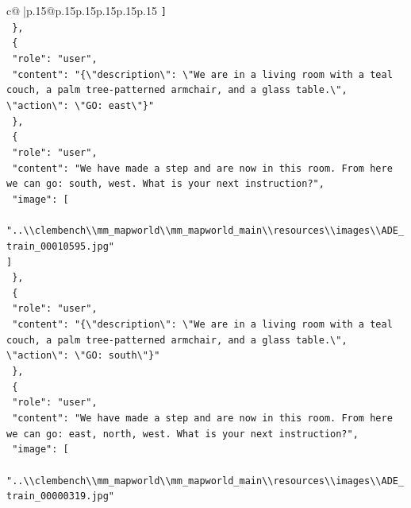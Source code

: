 \documentclass{article}
\begin{document}
{\begin{supertabular}{c@{$\;$}|p{.15\linewidth}@{}p{.15\linewidth}p{.15\linewidth}p{.15\linewidth}p{.15\linewidth}p{.15\linewidth}}
{{{\texttt{    {]}} \\
\texttt{  \},} \\
\texttt{  \{} \\
\texttt{    "role": "user",} \\
\texttt{    "content": "\{\textbackslash{}"description\textbackslash{}": \textbackslash{}"We are in a living room with a teal couch, a palm tree{-}patterned armchair, and a glass table.\textbackslash{}", \textbackslash{}"action\textbackslash{}": \textbackslash{}"GO: east\textbackslash{}"\}"} \\
\texttt{  \},} \\
\texttt{  \{} \\
\texttt{    "role": "user",} \\
\texttt{    "content": "We have made a step and are now in this room. From here we can go: south, west. What is your next instruction?",} \\
\texttt{    "image": {[}} \\
\texttt{      "..\textbackslash{}\textbackslash{}clembench\textbackslash{}\textbackslash{}mm\_mapworld\textbackslash{}\textbackslash{}mm\_mapworld\_main\textbackslash{}\textbackslash{}resources\textbackslash{}\textbackslash{}images\textbackslash{}\textbackslash{}ADE\_train\_00010595.jpg"} \\
\texttt{    {]}} \\
\texttt{  \},} \\
\texttt{  \{} \\
\texttt{    "role": "user",} \\
\texttt{    "content": "\{\textbackslash{}"description\textbackslash{}": \textbackslash{}"We are in a living room with a teal couch, a palm tree{-}patterned armchair, and a glass table.\textbackslash{}", \textbackslash{}"action\textbackslash{}": \textbackslash{}"GO: south\textbackslash{}"\}"} \\
\texttt{  \},} \\
\texttt{  \{} \\
\texttt{    "role": "user",} \\
\texttt{    "content": "We have made a step and are now in this room. From here we can go: east, north, west. What is your next instruction?",} \\
\texttt{    "image": {[}} \\
\texttt{      "..\textbackslash{}\textbackslash{}clembench\textbackslash{}\textbackslash{}mm\_mapworld\textbackslash{}\textbackslash{}mm\_mapworld\_main\textbackslash{}\textbackslash{}resources\textbackslash{}\textbackslash{}images\textbackslash{}\textbackslash{}ADE\_train\_00000319.jpg"} \\
}}}
\end{supertabular}}
\end{document}
